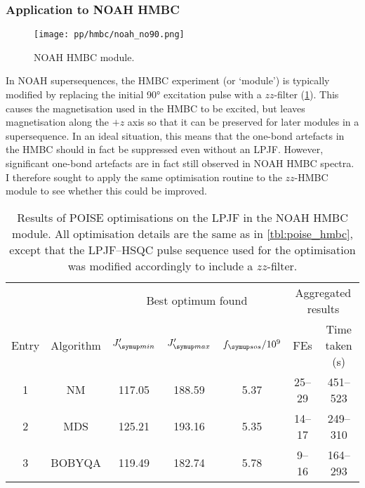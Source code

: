 \subsubsection{Application to NOAH HMBC}

\begin{figure}[htb]
    \centering
    \texttt{[image: pp/hmbc/noah\_no90.png]}%
    \caption[NOAH HMBC module]{
        NOAH HMBC module.
    }
    \label{fig:noah_hmbc_no90}
\end{figure}

In NOAH supersequences, the HMBC experiment (or `module') is typically modified by replacing the initial \ang{90} excitation pulse with a $zz$-filter (\cref{fig:noah_hmbc_no90}).\autocite{Kupce2018CC,Kupce2019JMR}
This causes the  magnetisation used in the HMBC to be excited, but leaves  magnetisation along the $+z$ axis so that it can be preserved for later modules in a supersequence.
In an ideal situation, this means that the one-bond artefacts in the HMBC should in fact be suppressed even without an LPJF.
However, significant one-bond artefacts are in fact still observed in NOAH HMBC spectra.
I therefore sought to apply the same optimisation routine to the $zz$-HMBC module to see whether this could be improved.


\begin{table}[htb]
    \centering
    \begin{tabular}{ccccccc}
        \toprule
              &           & \multicolumn{3}{c}{Best optimum found} & \multicolumn{2}{c}{Aggregated results} \\
        \cmidrule(lr){3-5} \cmidrule(lr){6-7}
        Entry & Algorithm & $\Jmin'$ & $\Jmax'$ & $\fsos / 10^9$ & FEs & Time taken (\unit{\s}) \\
        \midrule
        1     & NM        & 117.05 & 188.59                 & 5.37 & 25--29 & 451--523 \\
        2     & MDS       & 125.21 & 193.16                 & 5.35 & 14--17 & 249--310 \\
        3     & BOBYQA    & 119.49 & 182.74                 & 5.78 & 9--16  & 164--293 \\
        \bottomrule
    \end{tabular}
    \caption[NOAH HMBC low-pass J-filter optimisations]{
        Results of POISE optimisations on the LPJF in the NOAH HMBC module.
        All optimisation details are the same as in \cref{tbl:poise_hmbc}, except that the LPJF--HSQC pulse sequence used for the optimisation was modified accordingly to include a $zz$-filter.
    }
    \label{tbl:poise_hmbc_noah}
\end{table}

